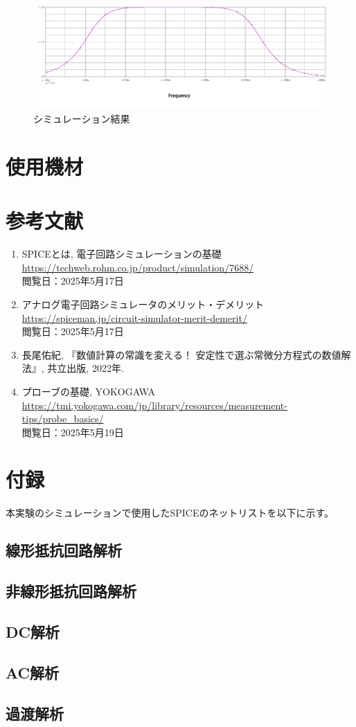 \documentclass{jlreq}
\numberwithin{equation}{section}
\begin{document}
\begin{figure}[H]
  \centering
  \includegraphics[width=\textwidth]{assets/bandpass.png}
  \caption{シミュレーション結果}
\end{figure}

\section{使用機材}

\section{参考文献}
\begin{enumerate}
  \item SPICEとは, 電子回路シミュレーションの基礎 \\
    \url{https://techweb.rohm.co.jp/product/simulation/7688/}\\
    閲覧日：2025年5月17日
  \item アナログ電子回路シミュレータのメリット・デメリット \\
    \url{https://spiceman.jp/circuit-simulator-merit-demerit/}\\
    閲覧日：2025年5月17日
  \item 長尾佑紀, 『数値計算の常識を変える！ 安定性で選ぶ常微分方程式の数値解法』, 共立出版, 2022年.
  \item プローブの基礎, YOKOGAWA \\
  \url{https://tmi.yokogawa.com/jp/library/resources/measurement-tips/probe_basics/} \\
  閲覧日：2025年5月19日
\end{enumerate}

\section{付録}
本実験のシミュレーションで使用したSPICEのネットリストを以下に示す。
\subsection{線形抵抗回路解析}

\subsection{非線形抵抗回路解析}

\subsection{DC解析}

\subsection{AC解析}

\subsection{過渡解析}
\end{document}
